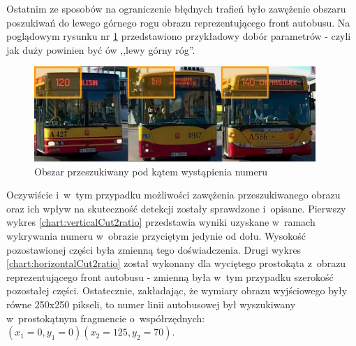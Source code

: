 Ostatnim ze sposobów na ograniczenie błędnych trafień było zawężenie
obszaru poszukiwań do lewego górnego rogu obrazu reprezentującego
front autobusu. Na poglądowym rysunku nr \ref{fig:frontupperleft} przedstawiono
przykładowy dobór parametrów - czyli jak duży powinien być ów ,,lewy górny róg''.

\begin{figure}[!h]
    \centering
    \includegraphics[width=0.95\textwidth]{img/exp_front_upper_left}
    \caption{Obszar przeszukiwany pod kątem wystąpienia numeru}
    \label{fig:frontupperleft}
\end{figure}

Oczywiście i~w~tym przypadku możliwości zawężenia przeszukiwanego obrazu 
oraz ich wpływ na skuteczność detekcji zostały sprawdzone i~opisane.
Pierwszy wykres \ref{chart:verticalCut2ratio} przedstawia wyniki uzyskane w~ramach
wykrywania numeru w~obrazie przyciętym jedynie od dołu.
Wysokość pozostawionej części była zmienną tego doświadczenia.
Drugi wykres \ref{chart:horizontalCut2ratio} został wykonany dla wyciętego prostokąta
 z~obrazu reprezentującego
front autobusu - zmienną była w~tym przypadku szerokość pozostałej części.
Ostatecznie, zakładając, że wymiary obrazu wyjściowego były równe 250x250 pikseli,
to numer linii autobusowej był wyszukiwany w~prostokątnym fragmencie o~współrzędnych:
$ (x_1=0,y_1=0) (x_2=125,y_2=70) $.


